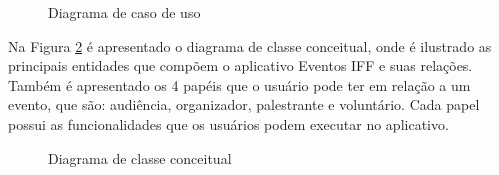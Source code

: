\begin{figure}[H]
    \centering
    \caption{Diagrama de caso de uso}
    \label{fig:caso-de-uso}
\end{figure}


Na Figura \ref{fig:digrama-classe} é apresentado o diagrama de classe conceitual, onde é ilustrado as principais entidades que compõem o aplicativo Eventos IFF e suas relações. Também é apresentado os 4 papéis que o usuário pode ter em relação a um evento, que são: audiência, organizador, palestrante e voluntário. Cada papel possui as funcionalidades que os usuários podem executar no aplicativo.

\begin{figure}[H]
    \centering
    \caption{Diagrama de classe conceitual}
    \label{fig:digrama-classe}
\end{figure}

